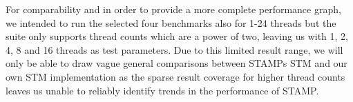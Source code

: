 For comparability and in order to provide a more complete performance graph, we intended to run the selected four benchmarks also for 1-24 threads but the suite only supports thread counts which are a power of two, leaving us with 1, 2, 4, 8 and 16 threads as test parameters.
Due to this limited result range, we will only be able to draw vague general comparisons between STAMPs STM and our own STM implementation as the sparse result coverage for higher thread counts leaves us unable to reliably identify trends in the performance of STAMP.

